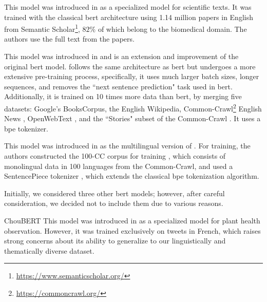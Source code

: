 \label{06_bert_scibert}
This model was introduced in  as a specialized model for scientific texts. It was trained with the classical \gls{bert} architecture using 1.14 million papers in English from Semantic Scholar\footnote{\url{https://www.semanticscholar.org/}}, $82\%$ of which belong to the biomedical domain. The authors use the full text from the papers. 


\label{06_bert_roberta}

This model was introduced in  and is an extension and improvement of the original \gls{bert} model. \bertroberta{} follows the same architecture as \gls{bert} but undergoes a more extensive pre-training process, specifically, it uses much larger batch sizes, longer sequences, and removes the ``next sentence prediction" task used in \gls{bert}. Additionally, it is trained on 10 times more data than \gls{bert}, by merging five datasets: Google’s BooksCorpus, the English Wikipedia, Common-Crawl\footnote{\url{https://commoncrawl.org/}} English News , OpenWebText , and the ``Stories" subset of the Common-Crawl . It uses a \gls{bpe} tokenizer.

\label{06_bert_xlmroberta}

This model was introduced in  as the multilingual version of \bertroberta{}. For training, the authors constructed the 100-CC corpus for training \bertxlmroberta{}, which consists of monolingual data in 100 languages from the Common-Crawl, and used a SentencePiece tokenizer , which extends the classical \gls{bpe} tokenization algorithm. 





\label{06_bert_excluded_models}

Initially, we considered three other \gls{bert} models; however, after careful consideration, we decided not to include them due to various reasons.



\begin{paragraph}{ChouBERT}
    This model was introduced in
     as a specialized model for plant health observation. However, it was trained exclusively on tweets in French, which raises strong concerns about its ability to generalize to our linguistically and thematically diverse dataset.
\end{paragraph}


